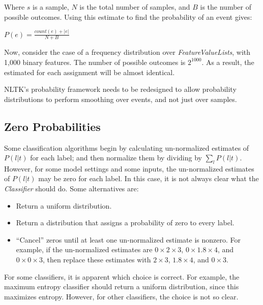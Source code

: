 \documentclass[12pt]{article}
\begin{document}
    \noindent Where $s$ is a sample, $N$ is the total number of
    samples, and $B$ is the number of possible outcomes.  Using this
    estimate to find the probability of an event gives:

      $P(e) = \frac{count(e) + |e|}{N+B}$

    \noindent Now, consider the case of a frequency distribution over
    \textit{FeatureValueLists}, with 1,000 binary features.  The
    number of possible outcomes is $2^{1000}$.  As a result, the
    estimated for each assignment will be almost identical.

    NLTK's probability framework needs to be redesigned to allow
    probability distributions to perform smoothing over events, and
    not just over samples.

  \subsection{Zero Probabilities}

    Some classification algorithms begin by calculating un-normalized
    estimates of $P(l|t)$ for each label; and then normalize them by
    dividing by $\sum_lP(l|t)$.  However, for some model settings and
    some inputs, the un-normalized estimates of $P(l|t)$ may be zero
    for each label.  In this case, it is not always clear what the
    \textit{Classifier} should do.  Some alternatives are:

    \begin{itemize}
      \item Return a uniform distribution.

      \item Return a distribution that assigns a probability of zero
      to every label.

      \item ``Cancel'' zeros until at least one un-normalized estimate
      is nonzero.  For example, if the un-normalized estimates are
      $0\times2\times3$, $0\times1.8\times4$, and $0\times0\times3$, then replace these estimates with
      $2\times3$, $1.8\times4$, and $0\times3$.
    \end{itemize}

    For some classifiers, it is apparent which choice is correct.  For
    example, the maximum entropy classifier should return a uniform
    distribution, since this maximizes entropy.  However, for other
    classifiers, the choice is not so clear.
\end{document}
